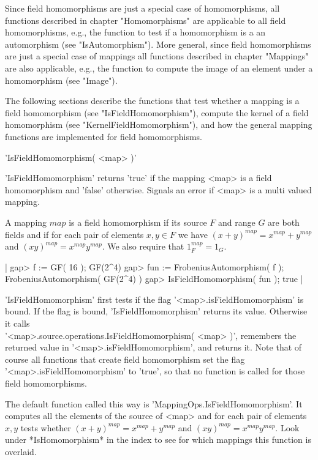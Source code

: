Since field homomorphisms are just a  special case of  homomorphisms, all
functions described  in  chapter  "Homomorphisms"  are applicable  to all
field homomorphisms, e.g., the function to test if a homomorphism is a an
automorphism   (see   "IsAutomorphism").    More   general,  since  field
homomorphisms are just a special case of mappings all functions described
in chapter "Mappings" are also applicable,  e.g., the function to compute
the image of an element under a homomorphism (see "Image").

The following sections describe the functions that test whether a mapping
is a field homomorphism (see  "IsFieldHomomorphism"), compute the  kernel
of  a  field  homomorphism  (see  "KernelFieldHomomorphism"), and how the
general mapping functions are implemented for field homomorphisms.

%

'IsFieldHomomorphism( <map> )'

'IsFieldHomomorphism' returns  'true'  if  the  mapping <map> is a  field
homomorphism and 'false' otherwise.  Signals an error if <map> is a multi
valued mapping.

A mapping $map$ is a field homomorphism if  its source  $F$ and range $G$
are both fields and  if  for each  pair of elements $x, y  \in F$ we have
$(x+y)^{map} = x^{map} + y^{map}$ and $(xy)^{map} = x^{map} y^{map}$.  We
also require that $1_F^{map} = 1_G$.

|    gap> f := GF( 16 );
    GF(2^4)
    gap> fun := FrobeniusAutomorphism( f );
    FrobeniusAutomorphism( GF(2^4) )
    gap> IsFieldHomomorphism( fun );
    true |

'IsFieldHomomorphism' first tests if the flag '<map>.isFieldHomomorphism'
is bound.  If the flag is bound, 'IsFieldHomomorphism' returns its value.
Otherwise it calls \\
'<map>.source.operations.IsFieldHomomorphism(  <map>  )',  remembers  the
returned value in '<map>.isFieldHomomorphism', and returns it.  Note that
of course all  functions  that create  field  homomorphism  set  the flag
'<map>.isFieldHomomorphism'  to 'true', so that no function is called for
those field homomorphisms.

The default function called this way is 'MappingOps.IsFieldHomomorphism'.
It computes all the elements of the source of <map> and  for each pair of
elements  $x, y$ tests whether $(x+y)^{map}  =  x^{map}  +  y^{map}$  and
$(xy)^{map} = x^{map} y^{map}$.  Look under *IsHomomorphism* in the index
to see for which mappings this function is overlaid.

